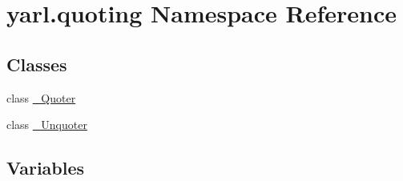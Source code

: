 \hypertarget{namespaceyarl_1_1quoting}{}\section{yarl.\+quoting Namespace Reference}
\label{namespaceyarl_1_1quoting}
\subsection*{Classes}
\begin{DoxyCompactItemize}
\item 
class \hyperlink{classyarl_1_1quoting_1_1___quoter}{\+\_\+\+Quoter}
\item 
class \hyperlink{classyarl_1_1quoting_1_1___unquoter}{\+\_\+\+Unquoter}
\end{DoxyCompactItemize}
\subsection*{Variables}
